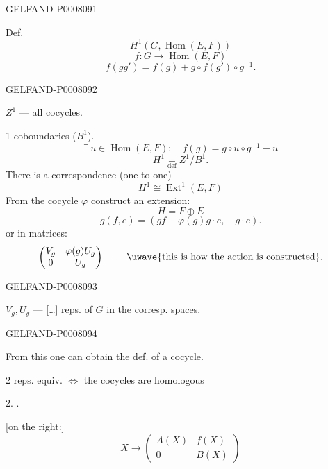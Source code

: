 \begin{GelfandAdjacentEvidence}{GELFAND-P000809}{1}

\underline{\underline{Def.}}
\[
H^1(G,\operatorname{Hom}(E,F))
\]
\[
f:G\longrightarrow\operatorname{Hom}(E,F)
\]
\begin{equation*}
f(gg')=f(g)+g\circ f(g')\circ g^{-1}.
\tag{2}
\end{equation*}
\end{GelfandAdjacentEvidence}
\begin{GelfandAdjacentEvidence}{GELFAND-P000809}{2}


\(Z^1\) --- all cocycles.

1-coboundaries (\(B^1\)).
\[
\exists\,u\in\operatorname{Hom}(E,F):\quad
f(g)=g\circ u\circ g^{-1}-u
\]
\[
H^1\underset{\mathrm{def}}{=}Z^1/B^1.
\]
There is a correspondence (one-to-one)
\[
H^1\cong\operatorname{Ext}^1(E,F)
\]
From the cocycle \(\varphi\) construct an extension:
\[
H=F\oplus E
\]
\begin{equation*}
g(f,e)=(gf+\varphi(g)g\cdot e,\quad g\cdot e).
\tag{3}
\end{equation*}
or in matrices:
\[
\begin{pmatrix}
V_g&\varphi(g)U_g\\
0&U_g
\end{pmatrix}
\quad\text{--- \uwave{this is how the action is constructed}.}
\]
\end{GelfandAdjacentEvidence}
\begin{GelfandAdjacentEvidence}{GELFAND-P000809}{3}


\(V_g,U_g\) --- [\sout{\ldots}] reps. of \(G\) in the corresp. spaces.
\end{GelfandAdjacentEvidence}
\begin{GelfandAdjacentEvidence}{GELFAND-P000809}{4}


From this one can obtain the def. of a cocycle.

2 reps. equiv. \(\Longleftrightarrow\) the cocycles are homologous

2. .

[on the right:]
\[
X\longrightarrow\begin{pmatrix}A(X)&f(X)\\0&B(X)\end{pmatrix}
\]
\end{GelfandAdjacentEvidence}



